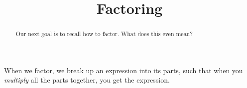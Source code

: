 \documentclass{ximera}
\begin{document}
\title{Factoring}

\begin{abstract}
Our next goal is to recall how to factor.  What does this even mean?
\end{abstract}
\maketitle



When we factor, we break up an expression into its parts, such that when you \emph{multiply} all the parts together, you get the expression.  
%
%
%
%
%
\end{document}
